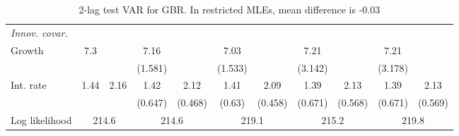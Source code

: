 \begin{table}[htbp]
\begin{tabular}{@{\extracolsep{4pt}}lcccccccccc@{}}
\rule{0pt}{4ex} \emph{Innov. covar.}  	 & 	 & 	 & 	 & 	 & 	 & 	 & 	 & 	 & 	 &\\ 
\quad Growth 	 &7.3 	 &  	 & 7.16 	 &  	 & 7.03 	 &  	 & 7.21 	 &  	 & 7.21 	 & 	 \\ 
 		 &  	 &  	 & (1.581) 	 &  	 & (1.533) 	 &  	 & (3.142) 	 &  	 & (3.178) 	 &  	 \\ 
\quad Int. rate 	 &1.44 	 & 2.16 	 & 1.42 	 & 2.12 	 & 1.41 	 & 2.09 	 & 1.39 	 & 2.13 	 & 1.39 	 & 2.13	 \\ 
 		 &  	 &  	 & (0.647) 	 & (0.468) 	 & (0.63) 	 & (0.458) 	 & (0.671) 	 & (0.568) 	 & (0.671) 	 & (0.569) 	 \\ 
 \hline \rule{0pt}{4ex} 
  Log likelihood 	 &\multicolumn{2}{c}{214.6} 	 & \multicolumn{2}{c}{214.6} 	 & \multicolumn{2}{c}{219.1} 	 & \multicolumn{2}{c}{215.2} 	 & \multicolumn{2}{c}{219.8}\\ 

 \hline 	\end{tabular}		\caption{2-lag test VAR for GBR. In restricted MLEs, mean difference is -0.03}
		\label{tab:GBR2lag}

\end{table}
